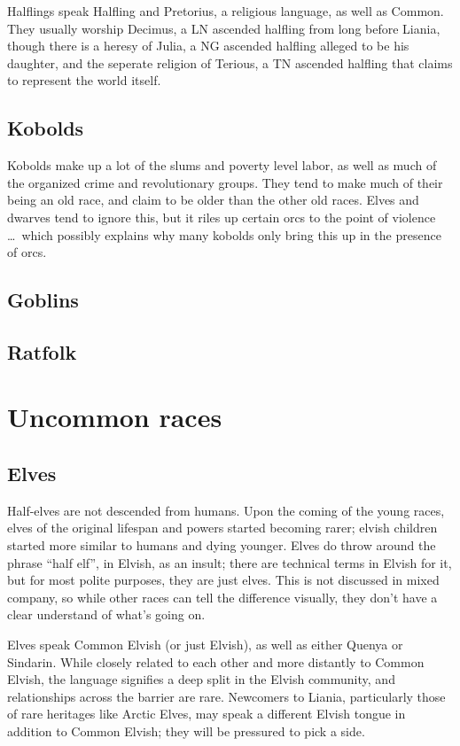 \documentclass{report}
\begin{document}
Halflings speak Halfling and Pretorius, a religious language, as well as Common.
They usually worship Decimus, a LN ascended halfling from long before Liania, though
there is a heresy of Julia, a NG ascended halfling alleged to be his daughter,
and the seperate religion of Terious, a TN ascended halfling that claims to represent the world itself.

\subsection{Kobolds}

Kobolds make up a lot of the slums and poverty level labor, as well as much of
the organized crime and revolutionary groups. They tend to make much of their
being an old race, and claim to be older than the other old races. Elves and
dwarves tend to ignore this, but it riles up certain orcs to the point of
violence \ldots\ which possibly explains why many kobolds only bring this up
in the presence of orcs.

\subsection{Goblins}

\subsection{Ratfolk}

\section {Uncommon races}

\subsection{Elves}

Half-elves are not descended from humans. Upon the coming of the young races,
elves of the original lifespan and powers started becoming rarer; elvish
children started more similar to humans and dying younger. Elves do throw around
the phrase ``half elf'', in Elvish, as an insult; there are technical terms in Elvish for it,
but for most polite purposes, they are just elves. This is not
discussed in mixed company, so while other races can tell the difference
visually, they don't have a clear understand of what's going on.

Elves speak Common Elvish (or just Elvish), as well as either Quenya or Sindarin.
While closely related to each other and more distantly to Common Elvish, the
language signifies a deep split in the Elvish community, and relationships
across the barrier are rare. Newcomers to Liania, particularly those of rare
heritages like Arctic Elves, may speak a different Elvish
tongue in addition to Common Elvish; they will be pressured to pick a side.
\end{document}
